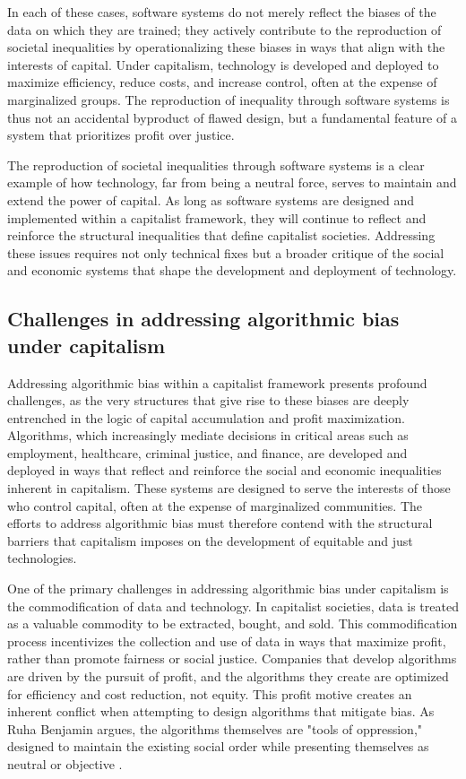 \begin{refsection}
In each of these cases, software systems do not merely reflect the biases of the data on which they are trained; they actively contribute to the reproduction of societal inequalities by operationalizing these biases in ways that align with the interests of capital. Under capitalism, technology is developed and deployed to maximize efficiency, reduce costs, and increase control, often at the expense of marginalized groups. The reproduction of inequality through software systems is thus not an accidental byproduct of flawed design, but a fundamental feature of a system that prioritizes profit over justice.

The reproduction of societal inequalities through software systems is a clear example of how technology, far from being a neutral force, serves to maintain and extend the power of capital. As long as software systems are designed and implemented within a capitalist framework, they will continue to reflect and reinforce the structural inequalities that define capitalist societies. Addressing these issues requires not only technical fixes but a broader critique of the social and economic systems that shape the development and deployment of technology.

\subsection{Challenges in addressing algorithmic bias under capitalism}

Addressing algorithmic bias within a capitalist framework presents profound challenges, as the very structures that give rise to these biases are deeply entrenched in the logic of capital accumulation and profit maximization. Algorithms, which increasingly mediate decisions in critical areas such as employment, healthcare, criminal justice, and finance, are developed and deployed in ways that reflect and reinforce the social and economic inequalities inherent in capitalism. These systems are designed to serve the interests of those who control capital, often at the expense of marginalized communities. The efforts to address algorithmic bias must therefore contend with the structural barriers that capitalism imposes on the development of equitable and just technologies.

One of the primary challenges in addressing algorithmic bias under capitalism is the commodification of data and technology. In capitalist societies, data is treated as a valuable commodity to be extracted, bought, and sold. This commodification process incentivizes the collection and use of data in ways that maximize profit, rather than promote fairness or social justice. Companies that develop algorithms are driven by the pursuit of profit, and the algorithms they create are optimized for efficiency and cost reduction, not equity. This profit motive creates an inherent conflict when attempting to design algorithms that mitigate bias. As Ruha Benjamin argues, the algorithms themselves are "tools of oppression," designed to maintain the existing social order while presenting themselves as neutral or objective \cite[pp.~15-18]{benjamin2019}.


\end{refsection}
